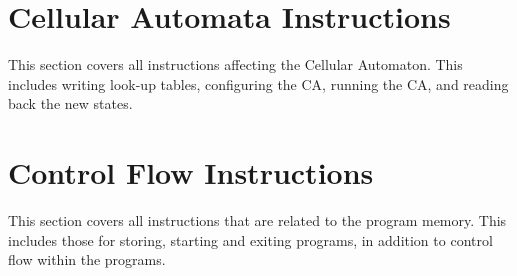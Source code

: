 \documentclass[a4paper]{article}
\begin{document}







\section{Cellular Automata Instructions}

This section covers all instructions affecting the Cellular Automaton.
This includes writing look-up tables, configuring the CA, running the CA, and reading back the new states.








\section{Control Flow Instructions}

This section covers all instructions that are related to the program memory.
This includes those for storing, starting and exiting programs, in addition to control flow within the programs.










\end{document}
